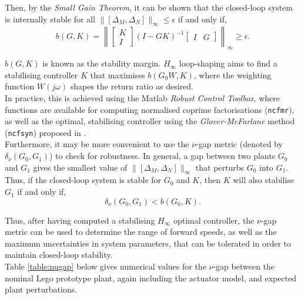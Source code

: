 Then, by the \textit{Small Gain Theorem}, it can be shown that the closed-loop system is internally stable for all $\lVert [\Delta_M, \Delta_N] \rVert_{\infty} \leq \epsilon$ if and only if,
\begin{equation*}
b(G,K) = \left \lVert \begin{bmatrix}
K \\
I
\end{bmatrix} (I - G K)^{-1} \begin{bmatrix}
I & G
\end{bmatrix} \right \rVert_{\infty} \geq \epsilon.
\end{equation*}

$b(G,K)$ is known as the stability margin. $H_{\infty}$ loop-shaping aims to find a stabilising controller $K$ that maximises $b(G_0 W,K)$, where the weighting function $W(j\omega)$ shapes the return ratio as desired. \\

In practice, this is achieved using the Matlab \textit{Robust Control Toolbox}, where functions are available for computing normalised coprime factorisations (\texttt{ncfmr}), as well as the optimal, stabilising controller using the \textit{Glover-McFarlane} method (\texttt{ncfsyn}) proposed in \cite{hinf}. \\

Furthermore, it may be more convenient to use the $\nu$-gap metric (denoted by $\delta_{\nu}(G_0,G_1)$) to check for robustness. In general, a gap between two plants $G_0$ and $G_1$ gives the smallest value of $\lVert [\Delta_M, \Delta_N] \rVert_{\infty}$ that perturbs $G_0$ into $G_1$. Thus, if the closed-loop system is stable for $G_0$ and $K$, then $K$ will also stabilise $G_1$ if and only if,
\begin{equation*}
\delta_{\nu}(G_0,G_1) < b(G_0,K).
\end{equation*}

Thus, after having computed a stabilising $H_{\infty}$ optimal controller, the $\nu$-gap metric can be used to determine the range of forward speeds, as well as the maximum uncertainties in system parameters, that can be tolerated in order to maintain closed-loop stability. \\

Table \ref{table:nugap} below gives numerical values for the $\nu$-gap between the nominal Lego prototype plant, again including the actuator model, and expected plant perturbations.

